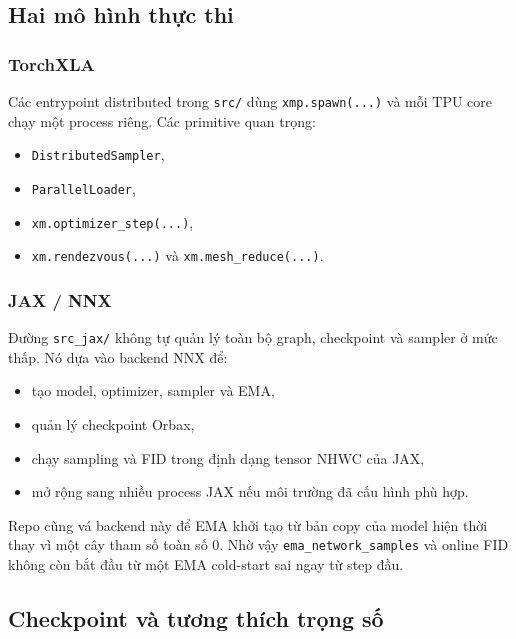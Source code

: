 \subsection{Hai mô hình thực thi}

\subsubsection{TorchXLA}

Các entrypoint distributed trong \texttt{src/} dùng \texttt{xmp.spawn(...)} và
mỗi TPU core chạy một process riêng. Các primitive quan trọng:

\begin{itemize}[leftmargin=1.5em]
  \item \texttt{DistributedSampler},
  \item \texttt{ParallelLoader},
  \item \texttt{xm.optimizer\_step(...)},
  \item \texttt{xm.rendezvous(...)} và \texttt{xm.mesh\_reduce(...)}.
\end{itemize}

\subsubsection{JAX / NNX}

Đường \texttt{src\_jax/} không tự quản lý toàn bộ graph, checkpoint và sampler ở
mức thấp. Nó dựa vào backend NNX để:

\begin{itemize}[leftmargin=1.5em]
  \item tạo model, optimizer, sampler và EMA,
  \item quản lý checkpoint Orbax,
  \item chạy sampling và FID trong định dạng tensor NHWC của JAX,
  \item mở rộng sang nhiều process JAX nếu môi trường đã cấu hình phù hợp.
\end{itemize}

Repo cũng vá backend này để EMA khởi tạo từ bản copy của model hiện thời thay vì
một cây tham số toàn số 0. Nhờ vậy \texttt{ema\_network\_samples} và online FID
không còn bắt đầu từ một EMA cold-start sai ngay từ step đầu.

\subsection{Checkpoint và tương thích trọng số}

